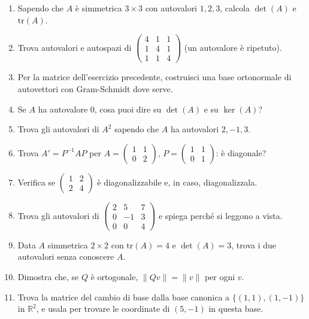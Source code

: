 \documentclass[a4paper,11pt]{article}
\begin{document}
\begin{enumerate}
  \item Sapendo che $A$ è simmetrica $3\times3$ con autovalori $1,2,3$, calcola $\det(A)$ e $\mathrm{tr}(A)$.
  \item Trova autovalori e autospazi di $\begin{pmatrix}4&1&1\\1&4&1\\1&1&4\end{pmatrix}$ (un autovalore è ripetuto).
  \item Per la matrice dell'esercizio precedente, costruisci una base ortonormale di autovettori con Gram-Schmidt dove serve.
  \item Se $A$ ha autovalore $0$, cosa puoi dire su $\det(A)$ e su $\ker(A)$?
  \item Trova gli autovalori di $A^2$ sapendo che $A$ ha autovalori $2,-1,3$.
  \item Trova $A'=P^{-1}AP$ per $A=\begin{pmatrix}1&1\\0&2\end{pmatrix}$, $P=\begin{pmatrix}1&1\\0&1\end{pmatrix}$: è diagonale?
  \item Verifica se $\begin{pmatrix}1&2\\2&4\end{pmatrix}$ è diagonalizzabile e, in caso, diagonalizzala.
  \item Trova gli autovalori di $\begin{pmatrix}2&5&7\\0&-1&3\\0&0&4\end{pmatrix}$ e spiega perché si leggono a vista.
  \item Data $A$ simmetrica $2\times2$ con $\mathrm{tr}(A)=4$ e $\det(A)=3$, trova i due autovalori senza conoscere $A$.
  \item Dimostra che, se $Q$ è ortogonale, $\|Qv\|=\|v\|$ per ogni $v$.
  \item Trova la matrice del cambio di base dalla base canonica a $\{(1,1),(1,-1)\}$ in $\mathbb R^2$, e usala per trovare le coordinate di $(5,-1)$ in questa base.
\end{enumerate}

\end{document}
